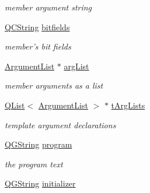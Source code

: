 \begin{DoxyCompactItemize}
\begin{DoxyCompactList}\small\item\em member argument string \end{DoxyCompactList}\item 
\hypertarget{class_entry_a3bef1412e2350a4b21ad3fcecb18771a}{\hyperlink{class_q_c_string}{Q\-C\-String} \hyperlink{class_entry_a3bef1412e2350a4b21ad3fcecb18771a}{bitfields}}\label{class_entry_a3bef1412e2350a4b21ad3fcecb18771a}

\begin{DoxyCompactList}\small\item\em member's bit fields \end{DoxyCompactList}\item 
\hypertarget{class_entry_ab7d5b9036bd044781194964d2dfd59bd}{\hyperlink{class_argument_list}{Argument\-List} $\ast$ \hyperlink{class_entry_ab7d5b9036bd044781194964d2dfd59bd}{arg\-List}}\label{class_entry_ab7d5b9036bd044781194964d2dfd59bd}

\begin{DoxyCompactList}\small\item\em member arguments as a list \end{DoxyCompactList}\item 
\hypertarget{class_entry_ae5ebd428a5652b1bd0cf92f0d98618bf}{\hyperlink{class_q_list}{Q\-List}$<$ \hyperlink{class_argument_list}{Argument\-List} $>$ $\ast$ \hyperlink{class_entry_ae5ebd428a5652b1bd0cf92f0d98618bf}{t\-Arg\-Lists}}\label{class_entry_ae5ebd428a5652b1bd0cf92f0d98618bf}

\begin{DoxyCompactList}\small\item\em template argument declarations \end{DoxyCompactList}\item 
\hypertarget{class_entry_adf5793d76eb2b16815a8017bed81468c}{\hyperlink{class_q_g_string}{Q\-G\-String} \hyperlink{class_entry_adf5793d76eb2b16815a8017bed81468c}{program}}\label{class_entry_adf5793d76eb2b16815a8017bed81468c}

\begin{DoxyCompactList}\small\item\em the program text \end{DoxyCompactList}\item 
\hypertarget{class_entry_a5efc3fc94544cf734c02ea402c536238}{\hyperlink{class_q_g_string}{Q\-G\-String} \hyperlink{class_entry_a5efc3fc94544cf734c02ea402c536238}{initializer}}\label{class_entry_a5efc3fc94544cf734c02ea402c536238}


\end{DoxyCompactItemize}
